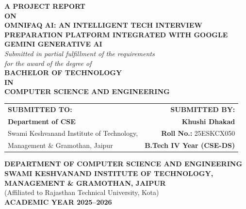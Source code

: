 \documentclass[12pt,a4paper]{report}
\begin{document}
\thispagestyle{empty}
\begin{titlepage}
\begin{center}

{\Large \textbf{A PROJECT REPORT}}\\[0.3cm]
{\large \textbf{ON}}\\[0.5cm]

{\LARGE \textbf{\textcolor{skitnavy}{OMNIFAQ AI: AN INTELLIGENT TECH INTERVIEW PREPARATION PLATFORM INTEGRATED WITH GOOGLE GEMINI GENERATIVE AI}}}\\[1.2cm]

{\large \textit{Submitted in partial fulfillment of the requirements}}\\[0.2cm]
{\large \textit{for the award of the degree of}}\\[0.4cm]
{\Large \textbf{BACHELOR OF TECHNOLOGY}}\\[0.2cm]
{\large \textbf{IN}}\\[0.2cm]
{\Large \textbf{COMPUTER SCIENCE AND ENGINEERING}}\\[1.2cm]

\begin{figure}[h!]
    \centering
\end{figure}
\vspace{0.8cm}

\begin{tabularx}{\textwidth}{Xr}
\textbf{SUBMITTED TO:} & \textbf{SUBMITTED BY:} \\
\textbf{Department of CSE} & \textbf{Khushi Dhakad} \\
Swami Keshvanand Institute of Technology, & \textbf{Roll No.:} 25ESKCX050 \\
Management \& Gramothan, Jaipur & \textbf{B.Tech IV Year (CSE-DS)} \\
\end{tabularx}

\vfill

{\large \textbf{DEPARTMENT OF COMPUTER SCIENCE AND ENGINEERING}}\\[0.2cm]
{\Large \textbf{\textcolor{skitnavy}{SWAMI KESHVANAND INSTITUTE OF TECHNOLOGY, MANAGEMENT \& GRAMOTHAN, JAIPUR}}}\\[0.2cm]
{\large (Affiliated to Rajasthan Technical University, Kota)}\\[0.3cm]
{\large \textbf{ACADEMIC YEAR 2025--2026}}

\end{center}
\end{titlepage}
\clearpage
\end{document}
